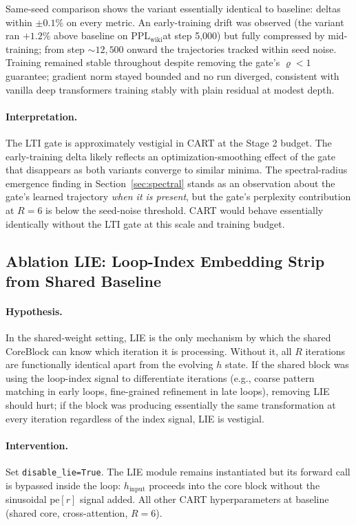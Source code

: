 \documentclass{article}
\newcommand{\cart}{\textsc{CART}}
\newcommand{\pplwiki}{PPL$_\text{wiki}$}
\begin{document}
Same-seed comparison shows the variant essentially identical to baseline: deltas within $\pm 0.1\%$ on every metric. An early-training drift was observed (the variant ran $+1.2\%$ above baseline on \pplwiki at step 5{,}000) but fully compressed by mid-training; from step $\sim 12{,}500$ onward the trajectories tracked within seed noise. Training remained stable throughout despite removing the gate's $\varrho < 1$ guarantee; gradient norm stayed bounded and no run diverged, consistent with vanilla deep transformers training stably with plain residual at modest depth.

\paragraph{Interpretation.}
The LTI gate is approximately vestigial in \cart{} at the Stage 2 budget. The early-training delta likely reflects an optimization-smoothing effect of the gate that disappears as both variants converge to similar minima. The spectral-radius emergence finding in Section~\ref{sec:spectral} stands as an observation about the gate's learned trajectory \emph{when it is present}, but the gate's perplexity contribution at $R{=}6$ is below the seed-noise threshold. \cart{} would behave essentially identically without the LTI gate at this scale and training budget.

\subsection{Ablation LIE: Loop-Index Embedding Strip from Shared Baseline}
\label{sec:abl_lie}

\paragraph{Hypothesis.}
In the shared-weight setting, LIE is the only mechanism by which the shared CoreBlock can know which iteration it is processing. Without it, all $R$ iterations are functionally identical apart from the evolving $h$ state. If the shared block was using the loop-index signal to differentiate iterations (e.g., coarse pattern matching in early loops, fine-grained refinement in late loops), removing LIE should hurt; if the block was producing essentially the same transformation at every iteration regardless of the index signal, LIE is vestigial.

\paragraph{Intervention.}
Set \texttt{disable\_lie=True}. The LIE module remains instantiated but its forward call is bypassed inside the loop: $h_\text{input}$ proceeds into the core block without the sinusoidal $\text{pe}[r]$ signal added. All other CART hyperparameters at baseline (shared core, cross-attention, $R{=}6$).
\end{document}
